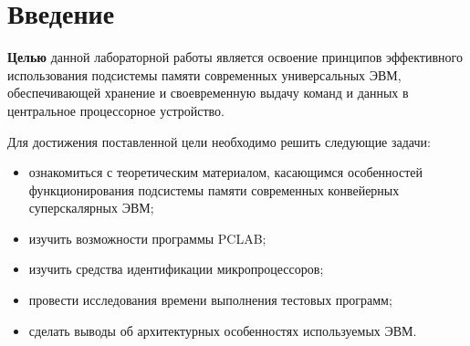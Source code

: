 \chapter*{Введение}

\textbf{Целью} данной лабораторной работы является освоение принципов эффективного использования подсистемы памяти современных универсальных ЭВМ, обеспечивающей хранение и своевременную выдачу команд и данных в центральное процессорное устройство.

Для достижения поставленной цели необходимо решить следующие задачи:
\begin{itemize}
	\item ознакомиться с теоретическим материалом, касающимся
особенностей функционирования подсистемы памяти современных конвейерных суперскалярных ЭВМ;
	\item изучить возможности программы PCLAB;
	\item изучить средства идентификации микропроцессоров;
	\item провести исследования времени выполнения тестовых
программ;
	\item сделать выводы об архитектурных особенностях используемых ЭВМ.
\end{itemize}